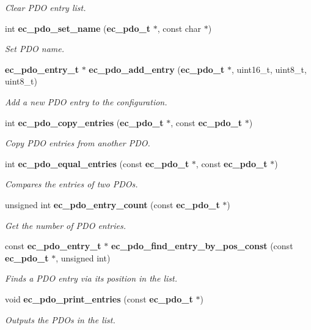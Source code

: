 \begin{DoxyCompactItemize}
\begin{DoxyCompactList}\small\item\em \-Clear \-P\-D\-O entry list. \end{DoxyCompactList}\item 
int {\bf ec\-\_\-pdo\-\_\-set\-\_\-name} ({\bf ec\-\_\-pdo\-\_\-t} $\ast$, const char $\ast$)
\begin{DoxyCompactList}\small\item\em \-Set \-P\-D\-O name. \end{DoxyCompactList}\item 
{\bf ec\-\_\-pdo\-\_\-entry\-\_\-t} $\ast$ {\bf ec\-\_\-pdo\-\_\-add\-\_\-entry} ({\bf ec\-\_\-pdo\-\_\-t} $\ast$, uint16\-\_\-t, uint8\-\_\-t, uint8\-\_\-t)
\begin{DoxyCompactList}\small\item\em \-Add a new \-P\-D\-O entry to the configuration. \end{DoxyCompactList}\item 
int {\bf ec\-\_\-pdo\-\_\-copy\-\_\-entries} ({\bf ec\-\_\-pdo\-\_\-t} $\ast$, const {\bf ec\-\_\-pdo\-\_\-t} $\ast$)
\begin{DoxyCompactList}\small\item\em \-Copy \-P\-D\-O entries from another \-P\-D\-O. \end{DoxyCompactList}\item 
int {\bf ec\-\_\-pdo\-\_\-equal\-\_\-entries} (const {\bf ec\-\_\-pdo\-\_\-t} $\ast$, const {\bf ec\-\_\-pdo\-\_\-t} $\ast$)
\begin{DoxyCompactList}\small\item\em \-Compares the entries of two \-P\-D\-Os. \end{DoxyCompactList}\item 
unsigned int {\bf ec\-\_\-pdo\-\_\-entry\-\_\-count} (const {\bf ec\-\_\-pdo\-\_\-t} $\ast$)
\begin{DoxyCompactList}\small\item\em \-Get the number of \-P\-D\-O entries. \end{DoxyCompactList}\item 
const {\bf ec\-\_\-pdo\-\_\-entry\-\_\-t} $\ast$ {\bf ec\-\_\-pdo\-\_\-find\-\_\-entry\-\_\-by\-\_\-pos\-\_\-const} (const {\bf ec\-\_\-pdo\-\_\-t} $\ast$, unsigned int)
\begin{DoxyCompactList}\small\item\em \-Finds a \-P\-D\-O entry via its position in the list. \end{DoxyCompactList}\item 
void {\bf ec\-\_\-pdo\-\_\-print\-\_\-entries} (const {\bf ec\-\_\-pdo\-\_\-t} $\ast$)\label{pdo_8h_ada7e926581a6a55fad6714a498297192}

\begin{DoxyCompactList}\small\item\em \-Outputs the \-P\-D\-Os in the list. \end{DoxyCompactList}\end{DoxyCompactItemize}


